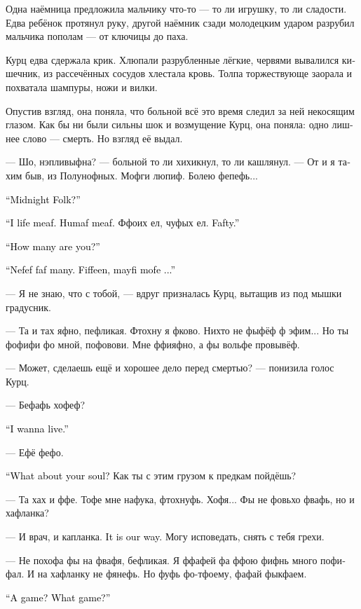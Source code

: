\documentclass[a4paper,12pt,fleqn]{book}\usepackage{cooltooltips}\usepackage{polyglossia}\setdefaultlanguage[babelshorthands=true]{russian}\setotherlanguage{english}\defaultfontfeatures{Ligatures=TeX,Mapping=tex-text} \usepackage{xcolor}\definecolor{lightgray}{HTML}{bbbbbb}\color{lightgray}\newcommand{\ml}[3]{\textenglish{\textcolor{black}{#3}}}
\begin{document}
Одна наёмница предложила мальчику что-то --- то ли игрушку, то ли сладости.
Едва ребёнок протянул руку, другой наёмник сзади молодецким ударом разрубил мальчика пополам --- от ключицы до паха.

Курц едва сдержала крик.
Хлюпали разрубленные лёгкие, червями вывалился кишечник, из рассечённых сосудов хлестала кровь.
Толпа торжествующе заорала и похватала шампуры, ножи и вилки.

Опустив взгляд, она поняла, что больной всё это время следил за ней некосящим глазом.
Как бы ни были сильны шок и возмущение Курц, она поняла: одно лишнее слово --- смерть.
Но взгляд её выдал.

--- Шо, нэпливыфна? --- больной то ли хихикнул, то ли кашлянул.
--- От и я тахим быв, из Полунофных.
Мофги люпиф.
Болею фепефь...

\ml{$0$}
{--- Полуночных?}
{``Midnight Folk?''}

\ml{$0$}
{--- Мяфо люпиф.}
{``I life meaf.}
\ml{$0$}
{Фелофека.}
{Humaf meaf.}
Ффоих ел, чуфых ел.
\ml{$0$}
{Вкуфно быво.}
{Fafty.''}

\ml{$0$}
{--- И много вас?}
{``How many are you?''}

\ml{$0$}
{--- Нихохта мнофо не фыво.}
{``Nefef faf many.}
\ml{$0$}
{Пифнаффафь, мофет фольфе...}
{Fiffeen, mayfi mofe ...''}

--- Я не знаю, что с тобой, --- вдруг призналась Курц, вытащив из под мышки градусник.

--- Та и тах яфно, пефликая.
Фтохну я фково.
Нихто не фыфёф ф эфим...
Но ты фофифи фо мной, пофовови.
Мне ффияфно, а фы вольфе провывёф.

--- Может, сделаешь ещё и хорошее дело перед смертью? --- понизила голос Курц.

--- Бефафь хофеф?

\ml{$0$}
{--- Жить хочу.}
{``I wanna live.''}

--- Ефё фефо.

\ml{$0$}
{--- О душе подумай.}
{``What about your soul?}
Как ты с этим грузом к предкам пойдёшь?

--- Та хах и ффе.
Тофе мне нафука, фтохнуфь.
Хофя...
Фы не фовьхо фвафь, но и хафланка?

--- И врач, и капланка.
\ml{$0$}
{Таков обычай.}
{It is our way.}
Могу исповедать, снять с тебя грехи.

--- Не похофа фы на фвафя, бефликая.
Я ффафей фа ффою фифнь много пофифал.
И на хафланку не фянефь.
Но фуфь фо-тфоему, фафай фыкфаем.

\ml{$0$}
{--- Сыграем?}
{``A game?}
\ml{$0$}
{Во что?}
{What game?''}
\end{document}
